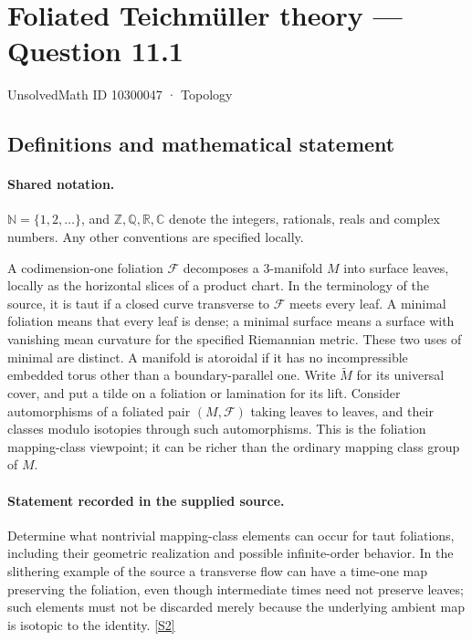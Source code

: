 \documentclass[11pt]{article}
\newcommand{\sref}[2]{\hyperlink{source:#1:#2}{[S#2]}}
\begin{document}
\setcounter{section}{10300046}
\section{Foliated Teichmüller theory — Question 11.1}\label{10300047}
{\small\sffamily UnsolvedMath ID 10300047 · Topology}
\subsection{Definitions and mathematical statement}

\paragraph{Shared notation.}$\mathbb N=\{1,2,\ldots\}$, and $\mathbb Z,\mathbb Q,\mathbb R,\mathbb C$ denote the integers, rationals, reals and complex numbers. Any other conventions are specified locally.


A codimension-one foliation $\mathcal F$ decomposes a $3$-manifold $M$ into surface leaves, locally as the horizontal slices of a product chart. In the terminology of the source, it is taut if a closed curve transverse to $\mathcal F$ meets every leaf. A minimal foliation means that every leaf is dense; a minimal surface means a surface with vanishing mean curvature for the specified Riemannian metric. These two uses of minimal are distinct. A manifold is atoroidal if it has no incompressible embedded torus other than a boundary-parallel one. Write $\widetilde M$ for its universal cover, and put a tilde on a foliation or lamination for its lift. Consider automorphisms of a foliated pair $(M,\mathcal F)$ taking leaves to leaves, and their classes modulo isotopies through such automorphisms. This is the foliation mapping-class viewpoint; it can be richer than the ordinary mapping class group of $M$.
\paragraph{Statement recorded in the supplied source.}
Determine what nontrivial mapping-class elements can occur for taut foliations, including their geometric realization and possible infinite-order behavior. In the slithering example of the source a transverse flow can have a time-one map preserving the foliation, even though intermediate times need not preserve leaves; such elements must not be discarded merely because the underlying ambient map is isotopic to the identity. \sref{10300047}{2}
\end{document}

